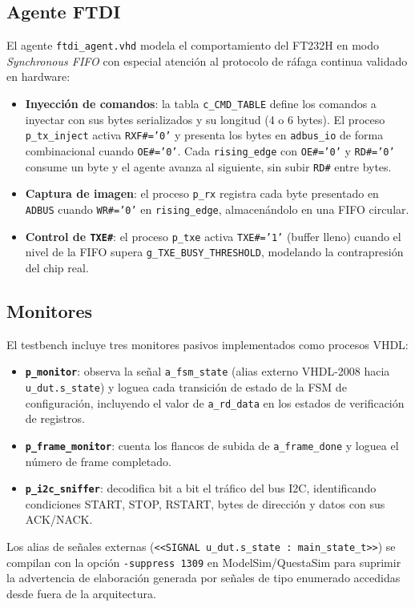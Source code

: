 \documentclass[../main.tex]{subfiles}
\begin{document}
\subsection{Agente FTDI}

El agente \texttt{ftdi\_agent.vhd} modela el comportamiento del FT232H en modo \textit{Synchronous FIFO} con especial atención al protocolo de ráfaga continua validado en hardware:

\begin{itemize}
    \item \textbf{Inyección de comandos}: la tabla \texttt{c\_CMD\_TABLE} define los comandos a inyectar con sus bytes serializados y su longitud (4 o 6 bytes). El proceso \texttt{p\_tx\_inject} activa \texttt{RXF\#='0'} y presenta los bytes en \texttt{adbus\_io} de forma combinacional cuando \texttt{OE\#='0'}. Cada \texttt{rising\_edge} con \texttt{OE\#='0'} y \texttt{RD\#='0'} consume un byte y el agente avanza al siguiente, sin subir \texttt{RD\#} entre bytes.
    \item \textbf{Captura de imagen}: el proceso \texttt{p\_rx} registra cada byte presentado en \texttt{ADBUS} cuando \texttt{WR\#='0'} en \texttt{rising\_edge}, almacenándolo en una FIFO circular.
    \item \textbf{Control de \texttt{TXE\#}}: el proceso \texttt{p\_txe} activa \texttt{TXE\#='1'} (buffer lleno) cuando el nivel de la FIFO supera \texttt{g\_TXE\_BUSY\_THRESHOLD}, modelando la contrapresión del chip real.
\end{itemize}

\subsection{Monitores}

El testbench incluye tres monitores pasivos implementados como procesos VHDL:

\begin{itemize}
    \item \textbf{\texttt{p\_monitor}}: observa la señal \texttt{a\_fsm\_state} (alias externo VHDL-2008 hacia \texttt{u\_dut.s\_state}) y loguea cada transición de estado de la FSM de configuración, incluyendo el valor de \texttt{a\_rd\_data} en los estados de verificación de registros.
    \item \textbf{\texttt{p\_frame\_monitor}}: cuenta los flancos de subida de \texttt{a\_frame\_done} y loguea el número de frame completado.
    \item \textbf{\texttt{p\_i2c\_sniffer}}: decodifica bit a bit el tráfico del bus I2C, identificando condiciones START, STOP, RSTART, bytes de dirección y datos con sus ACK/NACK.
\end{itemize}

Los alias de señales externas (\texttt{<<SIGNAL u\_dut.s\_state : main\_state\_t>>}) se compilan con la opción \texttt{-suppress 1309} en ModelSim/QuestaSim para suprimir la advertencia de elaboración generada por señales de tipo enumerado accedidas desde fuera de la arquitectura.
\end{document}
